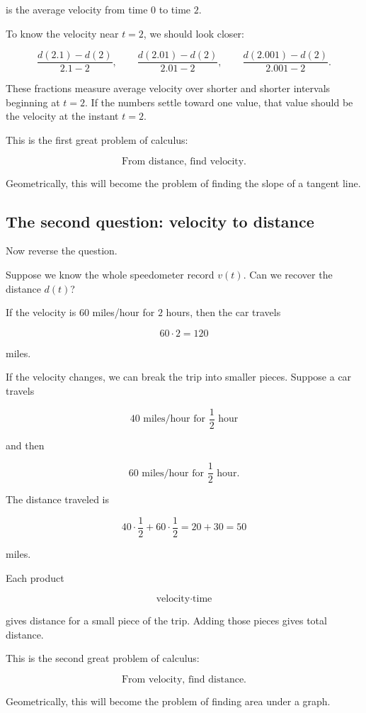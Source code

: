 is the average velocity from time \(0\) to time \(2\).

To know the velocity near \(t=2\), we should look closer:

\[
\frac{d(2.1)-d(2)}{2.1-2},
\qquad
\frac{d(2.01)-d(2)}{2.01-2},
\qquad
\frac{d(2.001)-d(2)}{2.001-2}.
\]

These fractions measure average velocity over shorter and shorter intervals beginning at \(t=2\). If the numbers settle toward one value, that value should be the velocity at the instant \(t=2\).

This is the first great problem of calculus:

\[
\boxed{\text{From distance, find velocity.}}
\]

Geometrically, this will become the problem of finding the slope of a tangent line.

\subsection{The second question: velocity to distance}

Now reverse the question.

Suppose we know the whole speedometer record \(v(t)\). Can we recover the distance \(d(t)\)?

If the velocity is \(60\) miles/hour for \(2\) hours, then the car travels

\[
60\cdot 2=120
\]

miles.

If the velocity changes, we can break the trip into smaller pieces. Suppose a car travels

\[
40\text{ miles/hour for } \frac12\text{ hour}
\]

and then

\[
60\text{ miles/hour for } \frac12\text{ hour}.
\]

The distance traveled is

\[
40\cdot \frac12 + 60\cdot \frac12
=
20+30
=
50
\]

miles.

Each product

\[
\text{velocity}\cdot \text{time}
\]

gives distance for a small piece of the trip. Adding those pieces gives total distance.

This is the second great problem of calculus:

\[
\boxed{\text{From velocity, find distance.}}
\]

Geometrically, this will become the problem of finding area under a graph.


